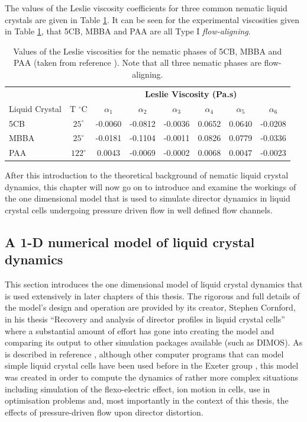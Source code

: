 The values of the Leslie viscosity coefficients for three common nematic liquid crystals are given in Table \ref{tab:visc}. It can be seen for the experimental viscosities given in Table \ref{tab:visc}, that 5CB, MBBA and PAA are all Type I \textit{flow-aligning}.
\\
\begin{table}[ht]
\centering  %
\begin{tabular}{l|c|cccccc} 
\hline\hline                       
&&\multicolumn{6}{c}{\textbf{Leslie Viscosity (Pa.s)}}\\
Liquid Crystal&T $^{\circ}$C&$\alpha_1$&$\alpha_2$&$\alpha_3$&$\alpha_4$&$\alpha_5$&$\alpha_6$\\
\hline                  
5CB &$25^{\circ}$& -0.0060& -0.0812&-0.0036&0.0652&0.0640&-0.0208\\
MBBA& $25^{\circ}$&-0.0181&-0.1104&-0.0011&0.0826&0.0779&-0.0336\\
PAA& $122^{\circ}$&0.0043&-0.0069&-0.0002&0.0068&0.0047&-0.0023\\
\hline
\end{tabular}
\caption[Values of the Leslie viscosities for the nematic phases of 5CB, MBBA and PAA]{Values of the Leslie viscosities for the nematic phases of 5CB, MBBA and PAA (taken from reference \cite{Stewart2004}). Note that all three nematic phases are flow-aligning.} 
\label{tab:visc}
\end{table}

After this introduction to the theoretical background of nematic liquid crystal dynamics, this chapter will now go on to introduce and examine the workings of the one dimensional model that is used to simulate director dynamics in liquid crystal cells undergoing pressure driven flow in well defined flow channels.

\newpage

\subsection{A 1-D numerical model of liquid crystal dynamics}
This section introduces the one dimensional model of liquid crystal dynamics that is used extensively in later chapters of this thesis. The rigorous and full details of the model's design and operation are provided by its creator, Stephen Cornford, in his thesis ``Recovery and analysis of director profiles in liquid crystal cells'' \cite{Cornford2008} where a substantial amount of effort has gone into creating the model and comparing its output to other simulation packages available (such as DIMOS). As is described in reference \cite{Cornford2008}, although other computer programs that can model simple liquid crystal cells have been used before in the Exeter group \cite{Birkett2008,Jewell2002}, this model was created in order to compute the dynamics of rather more complex situations including simulation of the flexo-electric effect, ion motion in cells, use in optimisation problems and, most importantly in the context of this thesis, the effects of pressure-driven flow upon director distortion.

